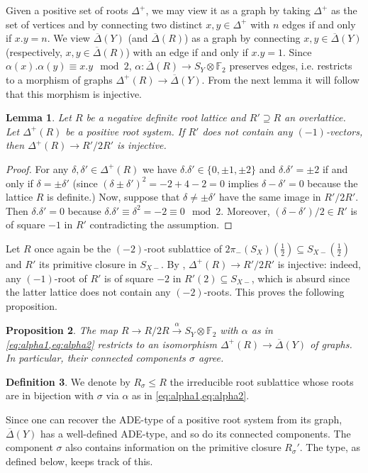 \documentclass[a4paper]{amsart}
\theoremstyle{definition}
\newtheorem{definition}{Definition}[section]
\theoremstyle{plain}
\newtheorem{lemma}[definition]{Lemma}
\newtheorem{proposition}[definition]{Proposition}
\newcommand{\FF}{\mathbb{F}}
\newcommand{\DeltabarY}{\overline{\Delta}(Y)}
\begin{document}
Given a positive set of roots $\Delta^+$, we may view it as a graph by taking $\Delta^+$ as the set of vertices and by connecting two distinct $x,y \in \Delta^+$ with $n$ edges if and only if $x.y=n$. We view $\DeltabarY$ (and $\overline{\Delta}(R)$) as a graph by connecting $x,y \in \DeltabarY$ (respectively, $x,y \in \overline{\Delta}(R)$) with an edge if and only if $x.y=1$. Since $\alpha(x).\alpha(y)\equiv x.y \mod 2$, $\alpha\colon \overline{\Delta}(R) \to S_Y\otimes \FF_2$ preserves edges, i.e. restricts to a morphism of graphs $\Delta^+(R) \to \DeltabarY$.
From the next lemma it will follow that this morphism is injective.
\begin{lemma}\label{roots_mod2_injective}
Let $R$ be a negative definite root lattice and $R' \supseteq R$ an overlattice.
Let $\Delta^+(R)$ be a positive root system.
If $R'$ does not contain any $(-1)$-vectors, then $\Delta^+(R) \to R'/2R'$ is injective.
\end{lemma}
\begin{proof}
For any $\delta,\delta' \in \Delta^+(R)$ we have $\delta.\delta' \in \{0,\pm 1, \pm 2\}$ and $\delta.\delta'=\pm 2$ if and only if $\delta=\pm \delta'$ (since $(\delta \pm \delta')^2=-2 + 4 - 2=0$ implies $\delta-\delta'=0$ because the lattice $R$ is definite.) Now, suppose that $\delta \neq \pm\delta'$ have the same image in $R'/2R'$. Then $\delta.\delta'=0$ because $\delta.\delta' \equiv \delta^2 =-2 \equiv 0 \mod 2$.
Moreover, $(\delta-\delta')/2 \in R'$ is of square $-1$ in $R'$ contradicting the assumption.
\end{proof}

Let $R$ once again be the $(-2)$-root sublattice of $2\pi_-(S_X)(\frac{1}{2})\subseteq S_{X-}(\frac{1}{2})$ and $R'$ its primitive closure in $S_{X-}$. By ,
$\Delta^+(R) \to R'/2R'$ is injective: indeed, any $(-1)$-root of $R'$ is of square $-2$ in $R'(2) \subseteq S_{X-}$, which is absurd since the latter lattice does not contain any $(-2)$-roots.
This proves the following proposition.
\begin{proposition}\label{prop:root_systems_mod2}
The map $R \to R/2R \xrightarrow{\alpha} S_Y \otimes \FF_2$ with $\alpha$ as in \cref{eq:alpha1,eq:alpha2} restricts to an isomorphism $\Delta^+(R)\to \DeltabarY$ of graphs. In particular, their connected components $\sigma$ agree.
\end{proposition}
\begin{definition}\label{def:R_sigma}
We denote by $R_\sigma \leq R$ the irreducible root sublattice whose roots are in bijection with $\sigma$ via $\alpha$ as in \cref{eq:alpha1,eq:alpha2}.
\end{definition}
Since one can recover the ADE-type of a positive root system from its graph, $\DeltabarY$ has a well-defined ADE-type, and so do its connected components.
The component $\sigma$ also contains information on the primitive closure $R_\sigma'$. The type, as defined below, keeps track of this. 
\end{document}
